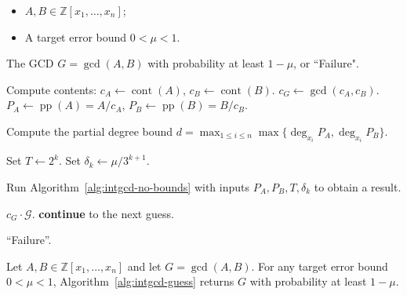 \documentclass{article}
\numberwithin{equation}{section}
\begin{document}
\begin{algorithm}[H]
\caption{Polynomial GCD Algorithm over the Integers}
\label{alg:intgcd-guess}
\begin{algorithmic}[1]
\Require
    \begin{itemize}
        \item $A, B \in \mathbb{Z}[x_1,\dots,x_n]$;
        \item A target error bound $0 < \mu < 1$.
    \end{itemize}
\Ensure
    The GCD $G = \gcd(A,B)$ with probability at least $1-\mu$, or ``Failure".

\State Compute contents: $c_A \gets \operatorname{cont}(A)$, $c_B \gets \operatorname{cont}(B)$.
\State $c_G \gets \gcd(c_A, c_B)$.
\State $P_A \gets \operatorname{pp}(A) = A / c_A$, $P_B \gets \operatorname{pp}(B) = B / c_B$.

\State Compute the partial degree bound $d = \max_{1 \le i \le n}  \max\{\deg_{x_i} P_A, \deg_{x_i}P_B\}$.

    \State Set $T \gets 2^k$.
    \State Set $\delta_k \gets \mu / 3^{k+1}$.
    
    \State Run Algorithm~\ref{alg:intgcd-no-bounds} with inputs $P_A, P_B, T, \delta_k$ to obtain a result.
    
        \State \Return $c_G \cdot \mathcal{G}$.
        \State \textbf{continue} to the next guess.
    \EndIf
\EndFor

\State \Return ``Failure''.
\end{algorithmic}
\end{algorithm}

\begin{theorem}
Let $A, B \in \mathbb{Z}[x_1,\dots,x_n]$ and let $G = \gcd(A,B)$. 
For any target error bound $0 < \mu < 1$, Algorithm~\ref{alg:intgcd-guess} returns $G$ with probability at least $1-\mu$.
\end{theorem}
\end{document}

